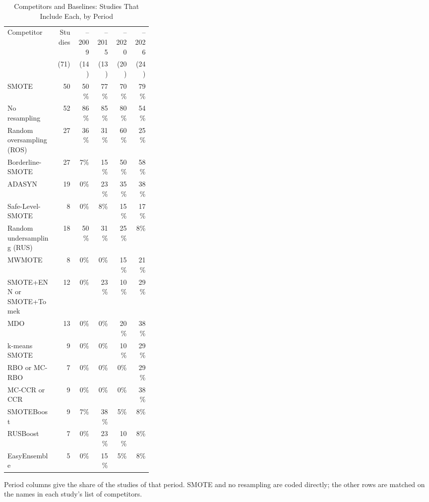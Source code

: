\begin{table}[t]
  \caption{Competitors and Baselines: Studies That Include Each, by Period}
  \label{tab:empirical-competitors}
  \footnotesize
  \setlength{\tabcolsep}{4pt}
  \begin{tabular}{@{}>{\raggedright\arraybackslash}p{0.34\linewidth}rrrrr@{}}
    \toprule
    Competitor & Studies & --2009 & --2015 & --2020 & --2026\\
    & (71) & (14) & (13) & (20) & (24)\\
    \midrule
    SMOTE & 50 & 50\% & 77\% & 70\% & 79\%\\
    No resampling & 52 & 86\% & 85\% & 80\% & 54\%\\
    \midrule
    Random oversampling (ROS) & 27 & 36\% & 31\% & 60\% & 25\%\\
    Borderline-SMOTE & 27 & 7\% & 15\% & 50\% & 58\%\\
    ADASYN & 19 & 0\% & 23\% & 35\% & 38\%\\
    Safe-Level-SMOTE & 8 & 0\% & 8\% & 15\% & 17\%\\
    Random undersampling (RUS) & 18 & 50\% & 31\% & 25\% & 8\%\\
    MWMOTE & 8 & 0\% & 0\% & 15\% & 21\%\\
    SMOTE+ENN or SMOTE+Tomek & 12 & 0\% & 23\% & 10\% & 29\%\\
    MDO & 13 & 0\% & 0\% & 20\% & 38\%\\
    k-means SMOTE & 9 & 0\% & 0\% & 10\% & 29\%\\
    RBO or MC-RBO & 7 & 0\% & 0\% & 0\% & 29\%\\
    MC-CCR or CCR & 9 & 0\% & 0\% & 0\% & 38\%\\
    SMOTEBoost & 9 & 7\% & 38\% & 5\% & 8\%\\
    RUSBoost & 7 & 0\% & 23\% & 10\% & 8\%\\
    EasyEnsemble & 5 & 0\% & 15\% & 5\% & 8\%\\
    \bottomrule
  \end{tabular}
  \par\smallskip\raggedright\scriptsize Period columns give the share of the studies of that period. SMOTE and no resampling are coded directly; the other rows are matched on the names in each study's list of competitors.
\end{table}
